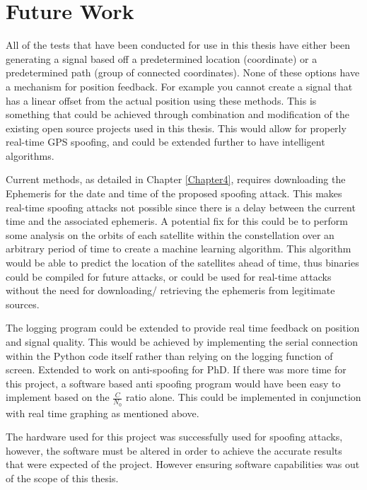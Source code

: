 \section{Future Work}
All of the tests that have been conducted for use in this thesis have either been generating a signal based off a predetermined location (coordinate) or a predetermined
path (group of connected coordinates). None of these options have a mechanism for position feedback. For example you cannot create a signal that has a linear offset from
the actual position using these methods. This is something that could be achieved through combination and modification of the existing open source projects used in this
thesis. This would allow for properly real-time GPS spoofing, and could be extended further to have intelligent algorithms.

Current methods, as detailed in Chapter \ref{Chapter4}, requires downloading the Ephemeris for the date and time of the proposed spoofing attack. This makes real-time spoofing
attacks not possible since there is a delay between the current time and the associated ephemeris. A potential fix for this could be to perform some analysis on the
orbits of each satellite within the constellation over an arbitrary period of time to create a machine learning algorithm. This algorithm would be able to predict the
location of the satellites ahead of time, thus binaries could be compiled for future attacks, or could be used for real-time attacks without the need for downloading/
retrieving the ephemeris from legitimate sources.

The logging program could be extended to provide real time feedback on position and signal quality. This would be achieved by implementing the serial connection within
the Python code itself rather than relying on the logging function of screen.
Extended to work on anti-spoofing for PhD. If there was more time for this project, a software based anti spoofing program would have been easy to implement based
on the $\frac{C}{N_0}$ ratio alone. This could be implemented in conjunction with real time graphing as mentioned above.

The hardware used for this project was successfully used for spoofing attacks, however, the software must be altered in order to achieve the accurate results that were
expected of the project. However ensuring software capabilities was out of the scope of this thesis.